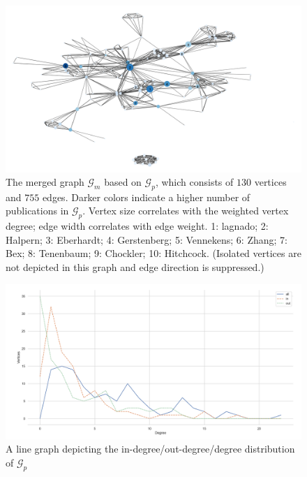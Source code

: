 \documentclass[11pt,a4paper]{book}
\theoremstyle{definition}
\theoremstyle{definition}
\theoremstyle{definition}
\theoremstyle{remark}
\newcommand{\pgraph}{\mathcal{G}_{p}}
\newcommand{\acgraph}{\mathcal{G}_{m}}
\begin{document}
\begin{figure}
\includegraphics[width=\textwidth]{mauthor_graph.png}
\caption{The merged graph  $\acgraph$ based on $\pgraph$, which consists of  $130$ vertices and $755$ edges. 
Darker colors indicate a higher number of publications in $\pgraph$. Vertex size correlates with the weighted vertex degree; 
edge width correlates with edge weight. 1: lagnado;
2: Halpern;
3: Eberhardt;
4: Gerstenberg;
5: Vennekens;
6: Zhang;
7: Bex;
8: Tenenbaum;
9: Chockler;
10: Hitchcock.
(Isolated vertices are not depicted in this graph and edge direction is suppressed.)}
\label{fig:acgraph-actual_graph}
\end{figure}




\begin{figure}[h]
\includegraphics[width=\textwidth]{degree_distribution.png}
\caption{A line graph depicting the in-degree/out-degree/degree distribution of $\pgraph$}
\label{fig:pgraph-degree_distr}
\end{figure}
\end{document}

